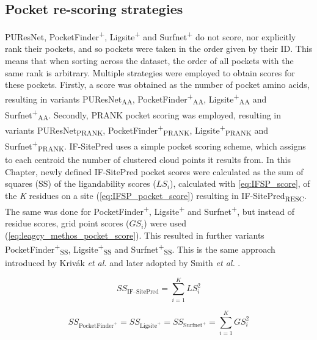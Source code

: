 \subsection{Pocket re-scoring strategies}

PUResNet, PocketFinder\textsuperscript{+}, Ligsite\textsuperscript{+} and Surfnet\textsuperscript{+} do not score, nor explicitly rank their pockets, and so pockets were taken in the order given by their ID. This means that when sorting across the dataset, the order of all pockets with the same rank is arbitrary. Multiple strategies were employed to obtain scores for these pockets. Firstly, a score was obtained as the number of pocket amino acids, resulting in variants PUResNet\textsubscript{AA}, PocketFinder\textsuperscript{+}\textsubscript{AA}, Ligsite\textsuperscript{+}\textsubscript{AA} and Surfnet\textsuperscript{+}\textsubscript{AA}. Secondly, PRANK pocket scoring was employed, resulting in variants PUResNet\textsubscript{PRANK}, PocketFinder\textsuperscript{+}\textsubscript{PRANK}, Ligsite\textsuperscript{+}\textsubscript{PRANK} and Surfnet\textsuperscript{+}\textsubscript{PRANK}. IF-SitePred uses a simple pocket scoring scheme, which assigns to each centroid the number of clustered cloud points it results from. In this Chapter, newly defined IF-SitePred pocket scores were calculated as the sum of squares (SS) of the ligandability scores ($LS_{i}$), calculated with \autoref{eq:IFSP_score}, of the \textit{K} residues on a site (\autoref{eq:IFSP_pocket_score}) resulting in IF-SitePred\textsubscript{RESC}. The same was done for PocketFinder\textsuperscript{+}, Ligsite\textsuperscript{+} and Surfnet\textsuperscript{+}, but instead of residue scores, grid point scores ($GS_{i}$) were used (\autoref{eq:leagcy_methos_pocket_score}). This resulted in further variants PocketFinder\textsuperscript{+}\textsubscript{SS}, Ligsite\textsuperscript{+}\textsubscript{SS} and Surfnet\textsuperscript{+}\textsubscript{SS}. This is the same approach introduced by Krivák \textit{et al.} \cite{KRIVAK_2015_P2RANK} and later adopted by Smith \textit{et al.} \cite{SMITH_2024_GrASP}.

\begin{equation}
SS_{\text{IF--SitePred}} = \sum_{i=1}^{K} LS_i^2
\label{eq:IFSP_pocket_score}
\end{equation}

\begin{equation}
SS_{\text{PocketFinder}^+} = SS_{\text{Ligsite}^+} = SS_{\text{Surfnet}^+} = \sum_{i=1}^{K} GS_i^2
\label{eq:leagcy_methos_pocket_score}
\end{equation}

